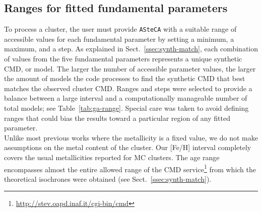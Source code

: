 \documentclass{aa}
\begin{document}

\subsection{Ranges for fitted fundamental parameters}
\label{ssec:param-ranges}

To process a cluster, the user must provide \texttt{ASteCA} with a
suitable range of accessible values for each fundamental parameter by
setting a minimum, a maximum, and a step.
%
As explained in Sect.~\ref{ssec:synth-match}, each combination of values
from the five fundamental parameters represents a unique synthetic CMD, or
model.
%
%
The larger the number of accessible parameter values, the larger the
amount of models the code processes to find the synthetic CMD that best
matches the observed cluster CMD.\@
%
Ranges and steps were selected to provide a balance between a large interval
and a computationally manageable number of total models;
see Table~\ref{tab:ga-range}. Special care was taken to avoid defining ranges
that could bias the results toward a particular region of any fitted
parameter.\\

Unlike most previous works where the metallicity is a fixed value, we do not
make assumptions on the metal content of the cluster. Our [Fe/H] interval
completely covers the usual metallicities reported for MC clusters.
The age range encompasses almost the entire allowed range of the CMD
service\footnote{\url{http://stev.oapd.inaf.it/cgi-bin/cmd}}
from which the theoretical isochrones were obtained (see
Sect.~\ref{ssec:synth-match}).
\end{document}
